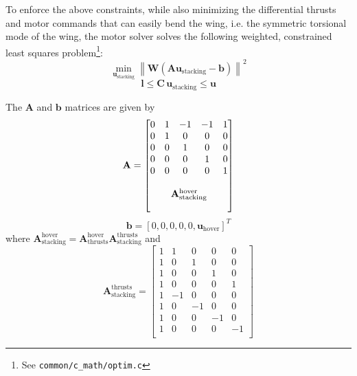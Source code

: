 \documentclass[11pt]{amsart}
\newcommand{\Athrustshover}{\mathbf{A}_{\mathrm{thrusts}}^{\mathrm{hover}}}
\newcommand{\Astackingthrusts}{\mathbf{A}_{\mathrm{stacking}}^{\mathrm{thrusts}}}
\newcommand{\Astackinghover}{\mathbf{A}_{\mathrm{stacking}}^{\mathrm{hover}}}
\newcommand{\norm}[1]{\left\lVert#1\right\rVert}
\begin{document}
To enforce the above constraints, while also minimizing the
differential thrusts and motor commands that can easily bend the wing,
i.e. the symmetric torsional mode of the wing, the motor solver solves
the following weighted, constrained least squares problem\footnote{
  See {\texttt{common/c\_math/optim.c}}}:
%
\begin{equation}
  \min_{\mathbf{u}_{\mathrm{stacking}}}
  \norm{\mathbf{W} \left(\mathbf{A} \mathbf{u}_{\mathrm{stacking}} - \mathbf{b}
    \right)}^2
\end{equation}
%
\begin{equation}
  \mathbf{l} \le \mathbf{C}\, \mathbf{u}_{\mathrm{stacking}} \le \mathbf{u}
\end{equation}

The $\mathbf{A}$ and $\mathbf{b}$ matrices are given by
%
\begin{equation}
  \mathbf{A} =
  \begin{bmatrix}
    0 & 1 & -1 & -1 & 1 \\
    0 & 1 &  0 &  0 & 0 \\
    0 & 0 &  1 &  0 & 0 \\
    0 & 0 &  0 &  1 & 0 \\
    0 & 0 &  0 &  0 & 1 \\
      &   &    &    &   \\
    \multicolumn{5}{c}{\Astackinghover} \\
      &   &    &    &
  \end{bmatrix}
\end{equation}
%
\begin{equation}
  \mathbf{b} = [0, 0, 0, 0, 0, \mathbf{u}_{\mathrm{hover}}]^T
\end{equation}
%
where $\Astackinghover = \Athrustshover \Astackingthrusts$ and
%
\begin{equation}
  \Astackingthrusts =
  \begin{bmatrix}
    1 &  1 &  0 &  0 &  0 \\
    1 &  0 &  1 &  0 &  0 \\
    1 &  0 &  0 &  1 &  0 \\
    1 &  0 &  0 &  0 &  1 \\
    1 & -1 &  0 &  0 &  0 \\
    1 &  0 & -1 &  0 &  0 \\
    1 &  0 &  0 & -1 &  0 \\
    1 &  0 &  0 &  0 & -1 \\
  \end{bmatrix}
\end{equation}
\end{document}
